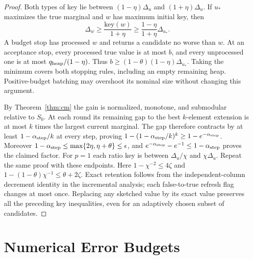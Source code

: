 \begin{proof}
Both types of key lie between $(1-\eta)\Delta_u$ and
$(1+\eta)\Delta_u$. If $u_*$ maximizes the true marginal and
$w$ has maximum initial key, then
\[
 \Delta_w\geq\frac{\mathrm{key}(w)}{1+\eta}
 \geq\frac{1-\eta}{1+\eta}\Delta_{u_*}.
\]
A budget stop has processed $w$ and returns a candidate no worse
than $w$. At an acceptance stop, every processed true value is
at most $b$, and every unprocessed one is at most $q_{\rm heap}/(1-\eta)$.
Thus $b\geq(1-\theta)(1-\eta)\Delta_{u_*}$.
Taking the minimum covers both stopping rules, including an
empty remaining heap. Positive-budget batching may overshoot
its nominal size without changing this argument.

By Theorem~\ref{thm:cm} the gain is normalized, monotone, and submodular relative
to $S_0$. At each round its remaining gap to the best $k$-element
extension is at most $k$ times the largest current marginal.
The gap therefore contracts by at least $1-\alpha_{\rm step}/k$ at every
step, proving $1-(1-\alpha_{\rm step}/k)^k\geq1-e^{-\alpha_{\rm step}}$.
Moreover $1-\alpha_{\rm step}\leq\max\{2\eta,\eta+\theta\}\leq\epsilon$,
and $e^{-\alpha_{\rm step}}-e^{-1}\leq1-\alpha_{\rm step}$ proves the claimed factor.
For $p=1$ each ratio key is between $\Delta_u/\chi$ and
$\chi\Delta_u$. Repeat the same proof with these endpoints.
Here $1-\chi^{-2}\leq4\zeta$ and
$1-(1-\theta)\chi^{-1}\leq\theta+2\zeta$.
Exact retention follows from the independent-column decrement
identity in the incremental analysis; each false-to-true refresh flag changes at most
once. Replacing any sketched value by its exact value preserves
all the preceding key inequalities, even for an adaptively
chosen subset of candidates.
\end{proof}



\section{Numerical Error Budgets}\label{app:numerical}

